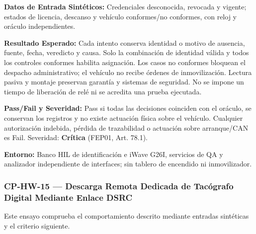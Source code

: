 \par\noindent \textbf{Datos de Entrada Sintéticos:} Credenciales desconocida, revocada y vigente; estados de licencia, descanso y vehículo conformes/no conformes, con reloj y oráculo independientes.\par
\par\noindent \textbf{Resultado Esperado:} Cada intento conserva identidad o motivo de ausencia, fuente, fecha, veredicto y causa. Solo la combinación de identidad válida y todos los controles conformes habilita asignación. Los casos no conformes bloquean el despacho administrativo; el vehículo no recibe órdenes de inmovilización. Lectura pasiva y montaje preservan garantía y sistemas de seguridad. No se impone un tiempo de liberación de relé ni se acredita una prueba ejecutada.\par
\par\noindent \textbf{Pass/Fail y Severidad:} Pass si todas las decisiones coinciden con el oráculo, se conservan los registros y no existe actuación física sobre el vehículo. Cualquier autorización indebida, pérdida de trazabilidad o actuación sobre arranque/CAN es Fail. Severidad: \textbf{Crítica} (FEP01, Art. 78.1).\par
\par\noindent \textbf{Entorno:} Banco HIL de identificación e iWave G26I, servicios de QA y analizador independiente de interfaces; sin tablero de encendido ni inmovilizador.\par


\subsubsection*{CP-HW-15 — Descarga Remota Dedicada de Tacógrafo Digital Mediante Enlace DSRC}\label{sec:9-cp-hw-15}
Este ensayo comprueba el comportamiento descrito mediante entradas sintéticas y el criterio siguiente.

